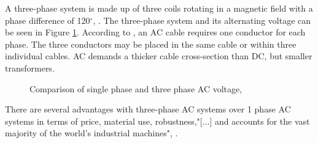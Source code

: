 \noindent A three-phase system is made up of three coils rotating in a magnetic field with a phase difference of 120$^{\circ}$, \cite{Dale2000}. The three-phase system and its alternating voltage can be seen in Figure \ref{fig:volt}. According to \cite{Beckman}, an AC cable requires one conductor for each phase. The three conductors may be placed in the same cable or within three individual cables. AC demands a thicker cable cross-section than DC, but smaller transformers.

\begin{figure}[H]
\hfill
{}\hfill
\caption[$\; \:$Comparison of single phase and three phase AC voltage]{Comparison of single phase and three phase AC voltage, \cite{Dale2000}}
\label{fig:volt}
\end{figure}

\noindent There are several advantages with three-phase AC systems over 1 phase AC systems in terms of price, material use, robustness,"[...] and accounts for the vast majority of the world's industrial machines", \cite{1995Tac}.
 


